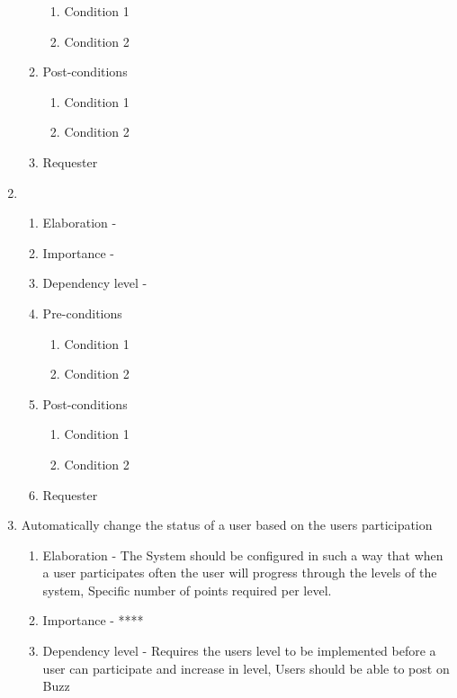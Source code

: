 \documentclass[12pt]{article}
\begin{document}
\begin{enumerate}
\begin{enumerate}
    \begin{enumerate}
    	\item Condition 1
    	\item Condition 2
    \end{enumerate}
        \item Post-conditions
    \begin{enumerate}
    	\item Condition 1
    	\item Condition 2
    \end{enumerate}
    \item Requester
  \end{enumerate}
\newpage %
   \item  %
  \begin{enumerate}
    \item Elaboration - 
    \item Importance - 
    \item Dependency level - 
    \item Pre-conditions
    \begin{enumerate}
    	\item Condition 1
    	\item Condition 2
    \end{enumerate}
        \item Post-conditions
    \begin{enumerate}
    	\item Condition 1
    	\item Condition 2
    \end{enumerate}
    \item Requester
  \end{enumerate}
\newpage %
   \item Automatically change the status of a user based on the users participation %
  \begin{enumerate}
    \item Elaboration - The System should be configured in such a way that when a user participates often the user will progress through the levels of the system, Specific number of points required per level.
    \item Importance - ****
    \item Dependency level - Requires the users level to be implemented before a user can participate and increase in level, Users should be able to post on Buzz

\end{enumerate}
\end{enumerate}
\end{document}

